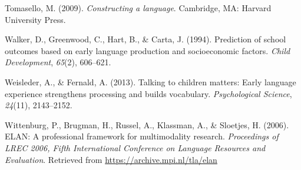 \documentclass[
  man,floatsintext]{apa6}
\newlength{\cslhangindent}
\newlength{\cslentryspacingunit} %
\newenvironment{CSLReferences}[2] %
 {%
  \setlength{\parindent}{0pt}
  \ifodd #1
  \let\oldpar\par
  \def\par{\hangindent=\cslhangindent\oldpar}
  \fi
  \setlength{\parskip}{#2\cslentryspacingunit}
 }%
 {}
\begin{document}
\begin{CSLReferences}{1}{0}
\leavevmode{}%
Tomasello, M. (2009). \emph{Constructing a language}. Cambridge, MA: Harvard University Press.

\leavevmode{}%
Walker, D., Greenwood, C., Hart, B., \& Carta, J. (1994). Prediction of school outcomes based on early language production and socioeconomic factors. \emph{Child Development}, \emph{65}(2), 606--621.

\leavevmode{}%
Weisleder, A., \& Fernald, A. (2013). Talking to children matters: Early language experience strengthens processing and builds vocabulary. \emph{Psychological Science}, \emph{24}(11), 2143--2152.

\leavevmode{}%
Wittenburg, P., Brugman, H., Russel, A., Klassman, A., \& Sloetjes, H. (2006). {ELAN}: {A} professional framework for multimodality research. \emph{Proceedings of LREC 2006, Fifth International Conference on Language Resources and Evaluation}. Retrieved from \url{https://archive.mpi.nl/tla/elan}

\end{CSLReferences}
\end{document}
